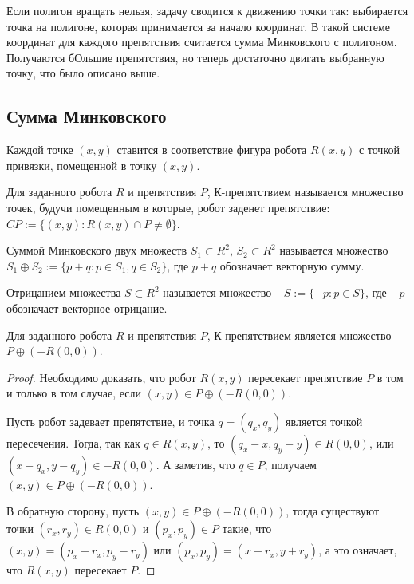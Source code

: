 Если полигон вращать нельзя, задачу сводится к движению точки так: выбирается точка на полигоне, которая принимается за начало координат.
В такой системе координат для каждого препятствия считается сумма Минковского с полигоном.
Получаются бОльшие препятствия, но теперь достаточно двигать выбранную точку, что было описано выше.

\subsection{Сумма Минковского}

Каждой точке $(x,y)$ ставится в соответствие фигура робота $R(x,y)$ с точкой привязки, помещенной в точку $(x,y)$.

\begin{definition}
    Для заданного робота $R$ и препятствия $P$, $К$-препятствием называется множество точек, будучи помещенным в которые, робот заденет препятствие: $CP:=\{(x,y):R(x,y) \cap P \not= \emptyset \}$.
\end{definition}

\begin{definition}
    Суммой Минковского двух множеств $S_1 \subset R^2$, $S_2 \subset R^2$ называется множество $S_1 \oplus S_2:=\{p+q:p \in S_1,q \in S_2\}$, где $p+q$ обозначает векторную сумму.
\end{definition}

\begin{definition}
    Отрицанием множества $S \subset R^2$ называется множество $-S:=\{−p:p \in S \}$, где $-p$ обозначает векторное отрицание.
\end{definition}

\begin{theorem}
    Для заданного робота $R$ и препятствия $P$, $К$-препятствием является множество $P \oplus (-R(0,0))$.
\end{theorem}
\begin{proof}
    Необходимо доказать, что робот $R(x,y)$ пересекает препятствие $P$ в том и только в том случае, если $(x,y) \in P \oplus (-R(0,0))$.
    
    Пусть робот задевает препятствие, и точка $q=(q_x,q_y)$ является точкой пересечения.
    Тогда, так как $q \in R(x,y)$, то $(q_x−x,q_y−y) \in R(0,0)$, или $(x−q_x,y−q_y) \in −R(0,0)$.
    А заметив, что $q \in P$, получаем $(x,y) \in P \oplus (-R(0,0))$.

    В обратную сторону, пусть $(x,y) \in P \oplus (-R(0,0))$, тогда существуют точки $(r_x,r_y) \in R(0,0)$ и $(p_x,p_y) \in P$ такие, что $(x,y)=(p_x−r_x,p_y−r_y)$ или $(p_x,p_y)=(x+r_x,y+r_y)$, а это означает, что $R(x,y)$ пересекает $P$. 
\end{proof}

